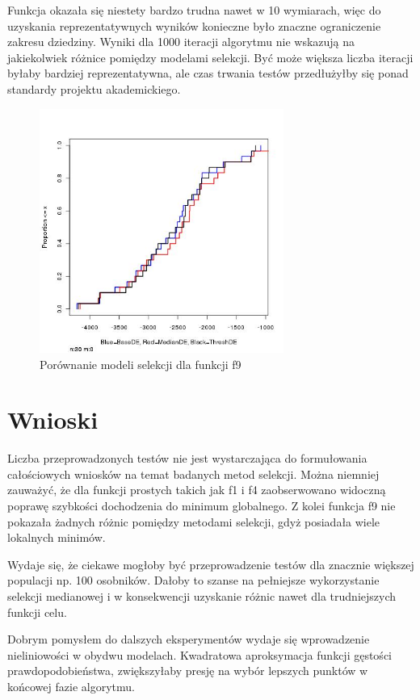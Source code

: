 \documentclass[11pt]{article}
\begin{document}
Funkcja okazała się niestety bardzo trudna nawet w 10 wymiarach, więc do uzyskania reprezentatywnych wyników konieczne było znaczne ograniczenie zakresu dziedziny.
Wyniki dla 1000 iteracji algorytmu nie wskazują na jakiekolwiek różnice pomiędzy modelami selekcji.
Być może większa liczba iteracji byłaby bardziej reprezentatywna, ale czas trwania testów przedłużyłby się ponad standardy projektu akademickiego.

\begin{figure}[ht]
\centering
\includegraphics[width=80mm]{cec2005_9.jpg}
\caption{Porównanie modeli selekcji dla funkcji f9}
\label{overflow}
\end{figure}

\section{Wnioski}
Liczba przeprowadzonych testów nie jest wystarczająca do formułowania całościowych wniosków na temat badanych metod selekcji.
Można niemniej zauważyć, że dla funkcji prostych takich jak f1 i f4 zaobserwowano widoczną poprawę szybkości dochodzenia do minimum globalnego.
Z kolei funkcja f9 nie pokazała żadnych różnic pomiędzy metodami selekcji, gdyż posiadała wiele lokalnych minimów.

Wydaje się, że ciekawe mogłoby być przeprowadzenie testów dla znacznie większej populacji np. 100 osobników.
Dałoby to szanse na pełniejsze wykorzystanie selekcji medianowej i w konsekwencji uzyskanie różnic nawet dla trudniejszych funkcji celu.

Dobrym pomysłem do dalszych eksperymentów wydaje się wprowadzenie nieliniowości w obydwu modelach.
Kwadratowa aproksymacja funkcji gęstości prawdopodobieństwa, zwiększyłaby presję na wybór lepszych punktów w końcowej fazie algorytmu.
\end{document}
